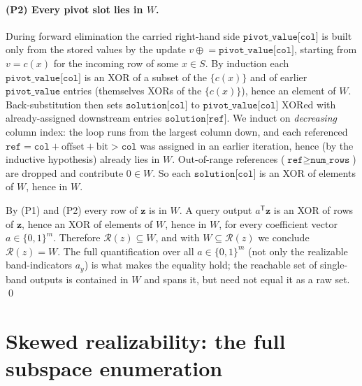 \documentclass[11pt]{article}
\theoremstyle{definition}
\theoremstyle{plain}
\theoremstyle{remark}
\newcommand{\B}{\{0,1\}}
\newcommand{\W}{W}                          %
\newcommand{\Rz}{\mathcal{R}(z)}            %
\newcommand{\bz}{\mathbf{z}}                %
\newcommand{\ay}{a_y}                       %
\newcommand{\cx}{c(x)}                      %
\begin{document}
\paragraph{(P2) Every pivot slot lies in $\W$.}
During forward elimination the carried right-hand side $\texttt{pivot\_value[col]}$ is built only
from the stored values by the update $v \mathrel{\oplus}= \texttt{pivot\_value[col]}$, starting from
$v = \cx$ for the incoming row of some $x \in S$. By induction each $\texttt{pivot\_value[col]}$ is
an XOR of a subset of the $\{\cx\}$ and of earlier $\texttt{pivot\_value}$ entries (themselves XORs
of the $\{\cx\}$), hence an element of $\W$. Back-substitution then sets $\texttt{solution[col]}$ to
$\texttt{pivot\_value[col]}$ XORed with already-assigned downstream entries
$\texttt{solution[ref]}$. We induct on \emph{decreasing} column index: the loop runs from the
largest column down, and each referenced $\texttt{ref} = \texttt{col} + \mathrm{offset} + \mathrm{bit}
> \texttt{col}$ was assigned in an earlier iteration, hence (by the inductive hypothesis) already
lies in $\W$. Out-of-range references ($\texttt{ref} \ge \texttt{num\_rows}$) are dropped and
contribute $0 \in \W$. So each $\texttt{solution[col]}$ is an XOR of elements of $\W$, hence in $\W$.

By (P1) and (P2) every row of $\bz$ is in $\W$. A query output $a^{\mathsf T}\bz$ is an XOR of rows
of $\bz$, hence an XOR of elements of $\W$, hence in $\W$, for every coefficient vector
$a \in \B^m$. Therefore $\Rz \subseteq \W$, and with $\W \subseteq \Rz$ we conclude $\Rz = \W$. The
full quantification over all $a \in \B^m$ (not only the realizable band-indicators $\ay$) is what
makes the equality hold; the reachable set of single-band outputs is contained in $\W$ and spans it,
but need not equal it as a raw set. \qed

\section{Skewed realizability: the full subspace enumeration}
\label{app:skewed}
\end{document}
